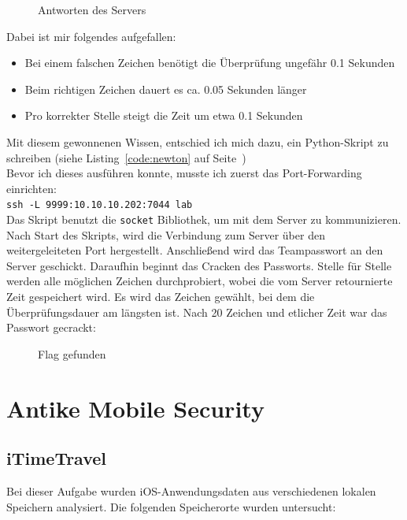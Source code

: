 \documentclass[12pt, a4paper, titlepage, oneside]{scrartcl}
\begin{document}
	\begin{figure}[h!]
		\centering
		\caption{Antworten des Servers}
		\label{fig:newton1}
	\end{figure}

	Dabei ist mir folgendes aufgefallen:
	\begin{itemize}
		\item Bei einem falschen Zeichen benötigt die Überprüfung ungefähr 0.1 Sekunden

		\item Beim richtigen Zeichen dauert es ca. 0.05 Sekunden länger

		\item Pro korrekter Stelle steigt die Zeit um etwa 0.1 Sekunden
	\end{itemize}
	Mit diesem gewonnenen Wissen, entschied ich mich dazu, ein Python-Skript zu schreiben
	(siehe Listing~\ref*{code:newton} auf Seite~\pageref*{code:newton}) \\ Bevor ich
	dieses ausführen konnte, musste ich zuerst das Port-Forwarding einrichten: \\ \lstinline{ssh -L 9999:10.10.10.202:7044 lab}
	\\ Das Skript benutzt die \lstinline{socket} Bibliothek, um mit dem Server zu
	kommunizieren. Nach Start des Skripts, wird die Verbindung zum Server über den
	weitergeleiteten Port hergestellt. Anschließend wird das Teampasswort an den Server
	geschickt. Daraufhin beginnt das Cracken des Passworts. Stelle für Stelle werden
	alle möglichen Zeichen durchprobiert, wobei die vom Server retournierte Zeit
	gespeichert wird. Es wird das Zeichen gewählt, bei dem die Überprüfungsdauer
	am längsten ist. Nach 20 Zeichen und etlicher Zeit war das Passwort gecrackt:

	\begin{figure}[h!]
		\centering
		\caption{Flag gefunden}
		\label{fig:newton2}
	\end{figure}

	\newpage

	\section{Antike Mobile Security}

	\subsection{iTimeTravel}
	Bei dieser Aufgabe wurden iOS-Anwendungsdaten aus verschiedenen lokalen
	Speichern analysiert. Die folgenden Speicherorte wurden untersucht:
\end{document}
